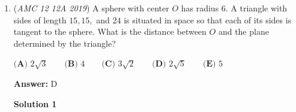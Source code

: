 \begin{enumerate}
Let $\alpha$, $\beta$, and $\gamma$ be the roots of the polynomial. By definition, the following equations are true.
 \begin{align*}     s_{k + 1} &= \alpha^{k + 1} + \beta^{k + 1} + \gamma^{k + 1} \\     s_k &= \alpha^k + \beta^k + \gamma^k \\     s_{k - 1} &= \alpha^{k - 1} + \beta^{k - 1} + \gamma^{k - 1} \\     s_{k - 2} &= \alpha^{k - 2} + \beta^{k - 2} + \gamma^{k - 2} \end{align*}
The equations could be used to find the relationships between the roots and $a$, $b$, and $c$.
 \begin{align*}     \alpha^{k + 1} + \beta^{k + 1} + \gamma^{k + 1}     &= a(\alpha^k + \beta^k + \gamma^k) + b(\alpha^{k - 1} + \beta^{k - 1} + \gamma^{k - 1}) + c(\alpha^{k - 2} + \beta^{k - 2} + \gamma^{k - 2}) \\     &= \alpha^{k - 2}(c + b\alpha + a\alpha^2) + \beta^{k - 2}(c + b\beta + a\beta^2) + \gamma^{k - 2}(c + b\gamma + a\gamma^2) \end{align*}
Continuing,
 \[\alpha^{k - 2}(\alpha^3 - a\alpha^2 - b\alpha - c) + \beta^{k - 2}(\beta^3 - a\beta^2 - b\beta - c) + \gamma^{k - 2}(\gamma^3 - a\gamma^2 - b\gamma - c) = 0\]Notice that if $x^3 - ax^2 - bx - c = 0$, the equation will satisfy. Thus, $a = 5$, $b = -8$, $c = 13$. Therefore, $a + b + c = \boxed{\textbf{(D)} 10}$.

 


	\item (\textit{AMC 12 12A 2019}) A sphere with center $O$ has radius $6$. A triangle with sides of length $15, 15,$ and $24$ is situated in space so that each of its sides is tangent to the sphere. What is the distance between $O$ and the plane determined by the triangle?


 $\textbf{(A) }2\sqrt{3}\qquad \textbf{(B) }4\qquad \textbf{(C) }3\sqrt{2}\qquad \textbf{(D) }2\sqrt{5}\qquad \textbf{(E) }5\qquad$

 \textbf{Answer: }D



\textbf{Solution 1}


\end{enumerate}
